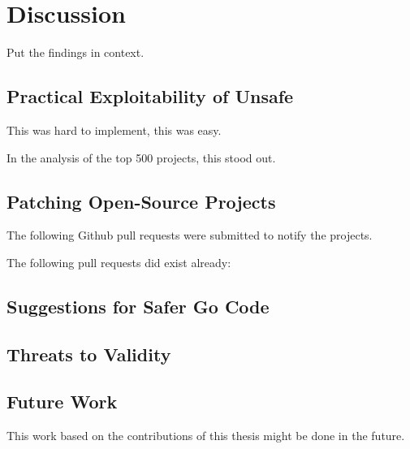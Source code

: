 \chapter{Discussion}\label{ch:discussion}

Put the findings in context.


\section{Practical Exploitability of Unsafe}

This was hard to implement, this was easy.

In the analysis of the top 500 projects, this stood out.


\section{Patching Open-Source Projects}

The following Github pull requests were submitted to notify the projects.



The following pull requests did exist already:




\section{Suggestions for Safer Go Code}


\section{Threats to Validity}


\section{Future Work}

This work based on the contributions of this thesis might be done in the future.
